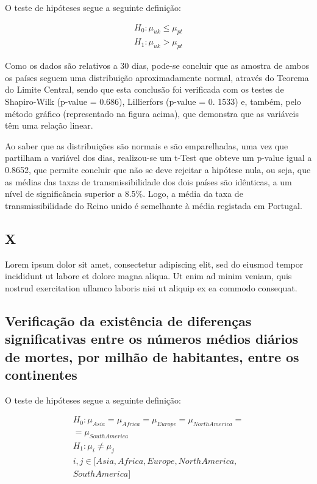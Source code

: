 \documentclass[conference]{IEEEtran}
\begin{document}
O teste de hipóteses segue a seguinte definição:

\begin{equation}
  \begin{array}{l}
    H_{0}:\mu _{uk}\leq \mu _{pt} \\
   	H_{1}:\mu _{uk}> \mu _{pt}
  \end{array}
\end{equation}

Como os dados são relativos a 30 dias, pode-se concluir que as amostra de ambos os países seguem uma distribuição aproximadamente normal, através do Teorema do Limite Central, sendo que esta conclusão foi verificada com os testes de Shapiro-Wilk (p-value = 0.686), Lillierfors (p-value = 0. 1533) e, também, pelo método gráfico (representado na figura acima), que demonstra que as variáveis têm uma relação linear. 

Ao saber que as distribuições são normais e são emparelhadas, uma vez que partilham a variável dos dias, realizou-se um t-Test que obteve um p-value igual a 0.8652, que permite concluir que não se deve rejeitar a hipótese nula, ou seja, que as médias das taxas de transmissibilidade dos dois países são idênticas, a um nível de significância superior a 8.5\%. Logo, a média da taxa de transmissibilidade do Reino unido é semelhante à média registada em Portugal.


\subsection{X}
Lorem ipsum dolor sit amet, consectetur adipiscing elit, sed do eiusmod tempor incididunt ut labore et dolore magna aliqua. Ut enim ad minim veniam, quis nostrud exercitation ullamco laboris nisi ut aliquip ex ea commodo consequat.

\subsection{Verificação da existência de diferenças significativas entre os números médios diários de mortes, por milhão de habitantes, entre os continentes}

O teste de hipóteses segue a seguinte definição:

\begin{equation}
  \begin{array}{l}
    H_{0}:\mu _{Asia}=\mu _{Africa}=\mu _{Europe}=\mu _{North America}= \\
    = \mu _{South America} \\ 
    H_{1}:\mu _{i}\neq \mu _{j} \\
    i,j\in [Asia, Africa, Europe, North America, \\
    South America]
  \end{array}
\end{equation}
\end{document}
